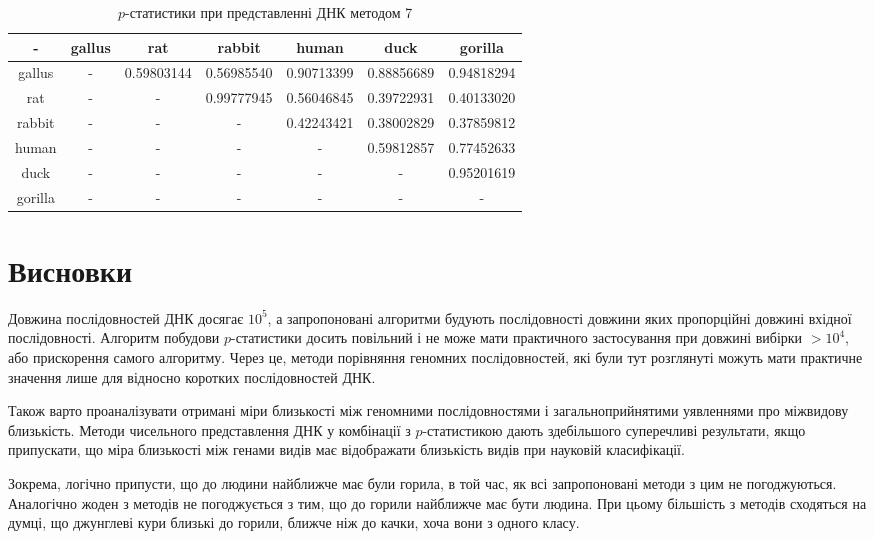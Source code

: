 \documentclass[14pt,a4paper,titlepage]{extarticle}
\begin{document}
\begin{table}[h!]
\begin{center}
\begin{tabular}{|c|c|c|c|c|c|c|}
\hline
- & gallus & rat & rabbit & human & duck & gorilla \\ \hline
gallus & - & 0.59803144 & 0.56985540 & 0.90713399 & 0.88856689 & 0.94818294 \\ \hline
rat & - & - & 0.99777945 & 0.56046845 & 0.39722931 & 0.40133020 \\ \hline
rabbit & - & - & - & 0.42243421 & 0.38002829 & 0.37859812 \\ \hline
human & - & - & - & - & 0.59812857 & 0.77452633 \\ \hline
duck & - & - & - & - & - & 0.95201619 \\ \hline
gorilla & - & - & - & - & - & - \\ \hline
\end{tabular}
\end{center}
\caption{$p$-статистики при представленні ДНК методом 7}
\label{table:res7}
\end{table}

\newpage
\section{Висновки}
Довжина послідовностей ДНК досягає $10^5$, а запропоновані алгоритми будують
послідовності довжини яких пропорційні довжині вхідної послідовності. Алгоритм
побудови $p$-статистики досить повільний і не може мати практичного
застосування при довжині вибірки $ > 10^4$, або прискорення самого алгоритму.
Через це, методи порівняння геномних послідовностей, які були тут розглянуті
можуть мати практичне значення лише для відносно коротких послідовностей ДНК.
\par

Також варто проаналізувати отримані міри близькості між геномними
послідовностями і загальноприйнятими уявленнями про міжвидову близькість.
Методи чисельного представлення ДНК у комбінації з $p$-статистикою дають
здебільшого суперечливі результати, якщо припускати, що міра близькості між
генами видів має відображати близькість видів при науковій класифікації.
\par

Зокрема, логічно припусти, що до людини найближче має були горила, в той час,
як всі запропоновані методи з цим не погоджуються. Аналогічно жоден з методів
не погоджується з тим, що до горили найближче має бути людина. При цьому
більшість з методів сходяться на думці, що джунглеві кури близькі до горили,
ближче ніж до качки, хоча вони з одного класу.
\end{document}
